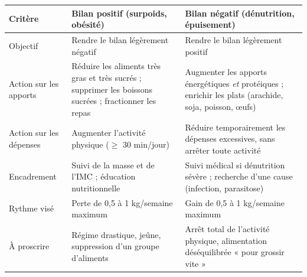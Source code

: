 \documentclass[11pt]{article}
\begin{document}
\begin{center}
\begin{tabularx}{\linewidth}{|l|X|X|}
\hline
\rowcolor{popblueL} \textbf{Critère} & \textbf{Bilan positif (surpoids, obésité)} & \textbf{Bilan négatif (dénutrition, épuisement)} \\
\hline
Objectif & Rendre le bilan légèrement négatif & Rendre le bilan légèrement positif \\
\hline
Action sur les apports & Réduire les aliments très gras et très sucrés ; supprimer les boissons sucrées ; fractionner les repas & Augmenter les apports énergétiques \emph{et} protéiques ; enrichir les plats (arachide, soja, poisson, œufs) \\
\hline
Action sur les dépenses & Augmenter l'activité physique ($\geq$ 30 min/jour) & Réduire temporairement les dépenses excessives, sans arrêter toute activité \\
\hline
Encadrement & Suivi de la masse et de l'IMC ; éducation nutritionnelle & Suivi médical si dénutrition sévère ; recherche d'une cause (infection, parasitose) \\
\hline
Rythme visé & Perte de 0,5 à 1 kg/semaine maximum & Gain de 0,5 à 1 kg/semaine maximum \\
\hline
À proscrire & Régime drastique, jeûne, suppression d'un groupe d'aliments & Arrêt total de l'activité physique, alimentation déséquilibrée « pour grossir vite » \\
\hline
\end{tabularx}
\end{center}
\end{document}
